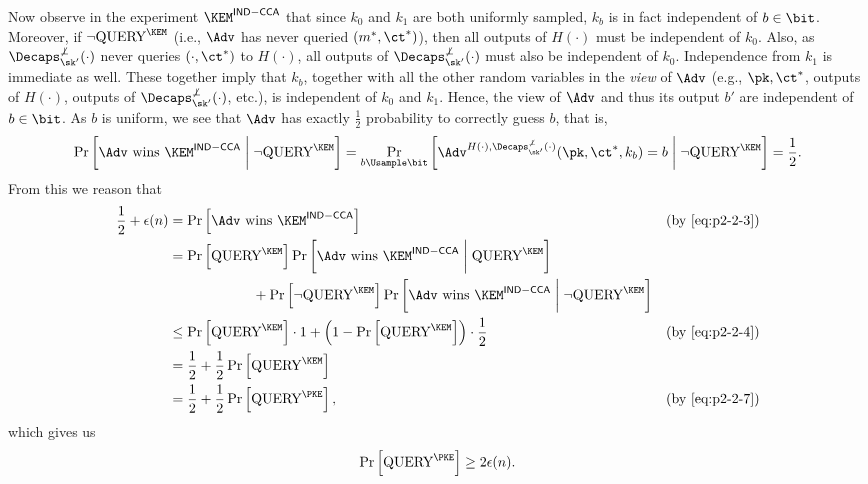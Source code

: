 \begin{answer}[ii]
    Now observe in the experiment $\KEM^{\mathsf{IND-CCA}}$ that since $k_0$ and $k_1$ are both uniformly sampled, $k_b$ is in fact independent of $b\in\bit$. 
    Moreover, if $\neg \textrm{QUERY}^\KEM$ (i.e., $\Adv$ has never queried $(m^\ast, \ct^\ast)$), then all outputs of $H(\cdot)$ must be independent of $k_0$. Also, as $\Decaps^{\not\bot}_{\sk'}(\cdot)$ never queries $(\cdot, \ct^\ast)$ to $H(\cdot)$, all outputs of $\Decaps^{\not\bot}_{\sk'}(\cdot)$ must also be independent of $k_0$. Independence from $k_1$ is immediate as well. These together imply that $k_b$, together with all the other random variables  in the \textit{view} of $\Adv$ (e.g., $\pk, \ct^\ast$, outputs of $H(\cdot)$, outputs of $\Decaps^{\not\bot}_{\sk'}(\cdot)$, etc.), is  independent of $k_0$ and $k_1$. 
    Hence, the view of $\Adv$ and thus its output $b'$ are independent of $b\in\bit$. As $b$ is uniform, we see that $\Adv$ has exactly $\frac{1}{2}$ probability to correctly guess $b$, that is,
    \begin{equation}\label{eq:p2-2-4}
        \Pr\left[\Adv \textrm{ wins } \KEM^{\mathsf{IND-CCA}} \biggm\vert \neg \textrm{QUERY}^\KEM \right]
        = \Pr_{b\Usample\bit}\left[\Adv^{H(\cdot), \Decaps^{\not\bot}_{\sk'}(\cdot)}(\pk, \ct^\ast, k_b)=b \biggm\vert \neg \textrm{QUERY}^\KEM \right]
        =\frac{1}{2}.
    \end{equation} 
    From this we reason that
    \begin{align*}
        \frac{1}{2}+\epsilon(n)
        &=  \Pr\left[\Adv \textrm{ wins } \KEM^{\mathsf{IND-CCA}} \right] && (\textrm{by \eqref{eq:p2-2-3}})\\
        &= \Pr\left[\textrm{QUERY}^\KEM\right]\Pr\left[\Adv \textrm{ wins } \KEM^{\mathsf{IND-CCA}}  \biggm\vert  \textrm{QUERY}^\KEM \right]\\
        &\qquad\qquad\qquad +\Pr\left[\neg \textrm{QUERY}^\KEM\right] \Pr\left[\Adv \textrm{ wins } \KEM^{\mathsf{IND-CCA}}  \biggm\vert \neg \textrm{QUERY}^\KEM \right]\\
        &\le \Pr\left[\textrm{QUERY}^\KEM\right]\cdot 1 + \left(1-  \Pr\left[\textrm{QUERY}^\KEM\right]\right) \cdot \frac{1}{2} 
        && (\textrm{by \eqref{eq:p2-2-4}})\\
        &= \frac{1}{2}+\frac{1}{2}\Pr\left[\textrm{QUERY}^\KEM\right]\\
        &= \frac{1}{2}+\frac{1}{2}\Pr\left[\textrm{QUERY}^\PKE\right],
        && (\textrm{by \eqref{eq:p2-2-7}})
    \end{align*}
    which gives us
    \begin{equation}\label{eq:p2-2-5}
        \Pr\left[\textrm{QUERY}^\PKE\right] \ge 2\epsilon(n).
    \end{equation}


\end{answer}
